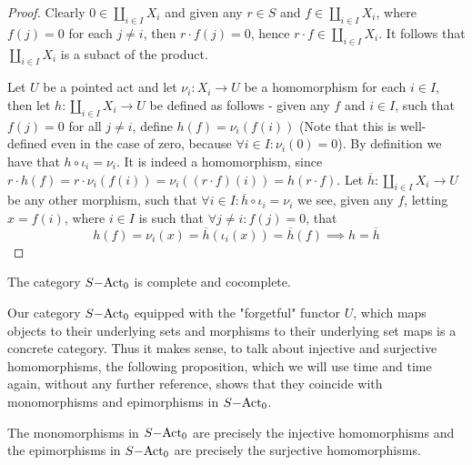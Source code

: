\begin{proof}
    Clearly $0\in\coprod_{i\in I } X_i$ and given any $r\in S$ and $f\in\coprod_{i\in I } X_i$, where 
    $f(j)=0$ for each $j\neq i$, then $r\cdot f(j)=0$, hence $r\cdot f \in\coprod_{i\in I} X_i$. It follows that 
    $\coprod_{i\in I} X_i$ is a subact of the product.\par 
    Let $U$ be a pointed act and let $\nu_i : X_i \to U$ be a homomorphism for each $i\in I$, then let $h: \coprod_{i\in I} X_i \to U$ be defined as follows - 
    given any $f$ and $i\in I$, such that $f(j)=0$ for all $j\neq i$, define $h(f) = \nu_i(f(i))$ (Note that this is well-defined 
    even in the case of zero, because $\forall i\in I : \nu_i(0) = 0$). By definition we have that $h\circ \iota_i = \nu_i$. It is 
    indeed a homomorphism, since $r\cdot h(f) = r\cdot\nu_i(f(i))=\nu_i((r\cdot f)(i)) = h(r\cdot f)$. Let 
    $\overline{h} : \coprod_{i\in I } X_i \to U$ be any other morphism, such that $\forall i\in I :\overline{h}\circ\iota_i = \nu_i$ we see, given 
    any $f$, letting $x=f(i)$, where $i\in I$ is such that $\forall j\neq i : f(j)=0$, that 
    \[
        h(f) = \nu_i(x) = \overline{h}(\iota_i(x)) = \overline{h}(f) \implies h=\overline{h} 
    \]
\end{proof}
\begin{corollary}
    The category $S\mathrm{-Act}_0$ is complete and cocomplete.
\end{corollary}
    Our category $S\mathrm{-Act}_0$ equipped with the "forgetful" functor $U$, which maps objects to their underlying sets and morphisms 
    to their underlying set maps is a concrete category. Thus it makes sense, to talk about injective and surjective homomorphisms, 
    the following proposition, which we will use time and time again, without any further reference, shows that they coincide with 
    monomorphisms and epimorphisms in $S\mathrm{-Act}_0$.
\begin{proposition}
    The monomorphisms in $S\mathrm{-Act}_0$ are precisely the injective homomorphisms and the epimorphisms in $S\mathrm{-Act}_0$ are precisely
    the surjective homomorphisms.
\end{proposition}

